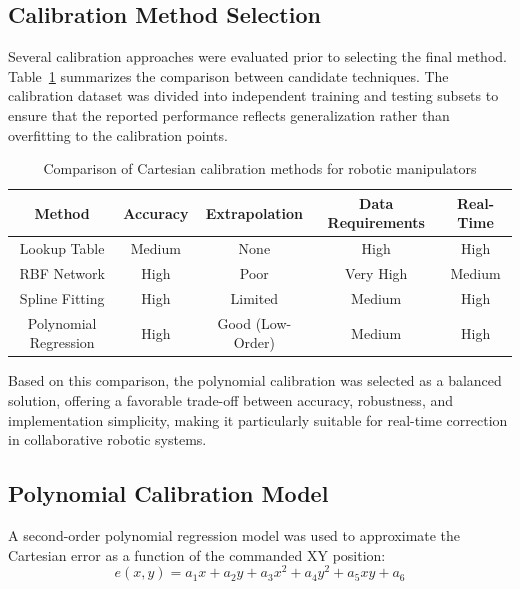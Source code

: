 \subsection{Calibration Method Selection}

Several calibration approaches were evaluated prior to selecting the final method. Table~\ref{tab:calib_comparison} summarizes the comparison between candidate techniques. The calibration dataset was divided into independent training and testing subsets to ensure that the reported performance reflects generalization rather than overfitting to the calibration points.

\begin{table}[H]
\centering
\renewcommand{\arraystretch}{1.3}
\begin{tabular}{|c|c|c|c|c|}
\hline
\textbf{Method} &
\textbf{Accuracy} &
\textbf{Extrapolation} &
\textbf{Data Requirements} &
\textbf{Real-Time} \\ \hline

Lookup
Table &
Medium &
None &
High &
High \\ \hline

RBF
Network &
High &
Poor &
Very High &
Medium \\ \hline

Spline
Fitting &
High &
Limited &
Medium &
High \\ \hline

Polynomial
Regression &
High &
Good (Low-Order) &
Medium &
High \\ \hline

\end{tabular}
\caption{Comparison of Cartesian calibration methods for robotic manipulators}
\label{tab:calib_comparison}
\end{table}

Based on this comparison, the polynomial calibration was selected as a balanced solution, offering a favorable trade-off between accuracy, robustness, and implementation simplicity, making it particularly suitable for real-time correction in collaborative robotic systems.

\subsection{Polynomial Calibration Model}

A second-order polynomial regression model was used to approximate the Cartesian error as a function of the commanded XY position:
\begin{equation}
e(x,y) = a_1 x + a_2 y + a_3 x^2 + a_4 y^2 + a_5 xy + a_6
\end{equation}

